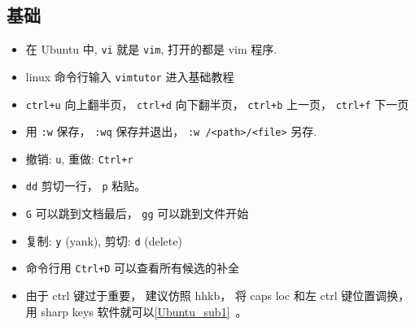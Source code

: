
\begin{issues}
\issueDraft
\end{issues}

\subsection{基础}
\begin{itemize}
\item 在 Ubuntu 中, \verb`vi` 就是 \verb`vim`, 打开的都是 vim 程序.
\item linux 命令行输入 \verb`vimtutor` 进入基础教程
\item \verb`ctrl+u` 向上翻半页， \verb|ctrl+d| 向下翻半页， \verb|ctrl+b| 上一页， \verb|ctrl+f| 下一页
\item 用 \verb|:w| 保存， \verb|:wq| 保存并退出， \verb`:w /<path>/<file>` 另存.
\item 撤销: \verb`u`, 重做: \verb`Ctrl+r`
\item \verb`dd` 剪切一行， \verb|p| 粘贴。
\item \verb`G` 可以跳到文档最后， \verb`gg` 可以跳到文件开始
\item 复制: \verb`y` (yank), 剪切: \verb`d` (delete)
\item 命令行用 \verb`Ctrl+D` 可以查看所有候选的补全
\item 由于 ctrl 键过于重要， 建议仿照 hhkb， 将 caps loc 和左 ctrl 键位置调换， 用 sharp keys 软件就可以\autoref{Ubuntu_sub1}~。
\end{itemize}


